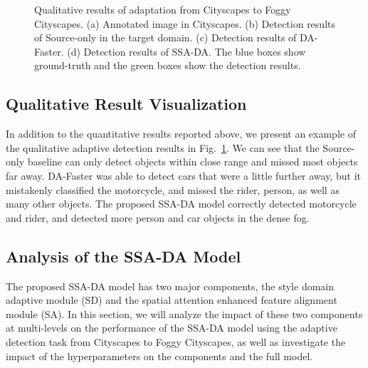 \documentclass[runningheads]{llncs}
\begin{document}
\begin{figure}[!h]
\centering
{}
   \caption{Qualitative results of adaptation from Cityscapes to Foggy Cityscapes. 
	(a) Annotated image in Cityscapes. (b) Detection results of Source-only in the target domain. 
	(c) Detection results of DA-Faster. (d) Detection results of SSA-DA. 
	The blue boxes show ground-truth and the green boxes show the detection results.}
\label{fig:five}
\end{figure}



\subsection{Qualitative Result Visualization}
In addition to the quantitative results reported above,
we present an example of the qualitative adaptive detection results in 
Fig.~\ref{fig:five}.  
We can see that the Source-only baseline can only detect objects within close range 
and missed most objects far away. 
DA-Faster was able to detect cars that were a little further away, 
but it mistakenly classified the motorcycle, and missed the rider, person, as well as many other objects. 
The proposed SSA-DA model correctly detected motorcycle and rider, 
and detected more person and car objects in the dense fog. 




\subsection{Analysis of the SSA-DA Model}
The proposed SSA-DA model has two major components, 
the style domain adaptive module (SD) and the spatial attention enhanced feature alignment module (SA).
In this section, we will analyze the impact of these two components at multi-levels
on the performance of the SSA-DA model using the adaptive detection task from Cityscapes to Foggy Cityscapes, 
as well as investigate the impact of the hyperparameters on the components and the full model.
\\
\end{document}

